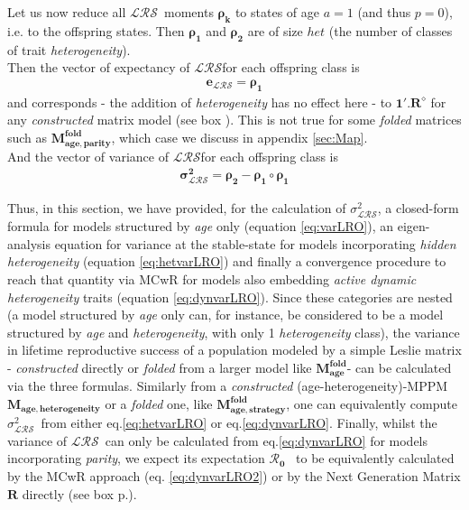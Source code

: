 \documentclass[10pt,a4paper]{article}
\newcommand{\Rzero}{$\boldsymbol{\mathcal{R}_{0}}$  }
\newcommand{\LRO}{$\mathcal{LRS}$}
\newcommand{\Ma}{$\mathbf{M^{fold}_{age}}$}
\newcommand{\Map}{$\mathbf{M^{fold}_{age,parity}}$}
\newcommand{\Mah}{$\mathbf{M^{fold}_{age,strategy}}$}
\newcommand{\vLRO}{$\sigma_{\mathrm{\mathcal{LRS}}}^2$}
\begin{document}
Let us now reduce all \LRO\ moments $\boldsymbol{\rho}_\mathbf{k}$ to states of age $a=1$ (and thus $p=0$), i.e. to the offspring states. Then $\boldsymbol{\rho}_\mathbf{1}$ and $\boldsymbol{\rho}_\mathbf{2}$ are of size $het$ (the number of classes of trait \emph{heterogeneity}). \\

Then the vector of expectancy of \LRO for each offspring class is
\begin{eqnarray}
\mathbf{e_{\mathcal{LRS}}}=\mathbf{\boldsymbol{\rho}_{1}}
\label{eq:dynvarLRO2}
\end{eqnarray}
 and corresponds - the addition of \emph{heterogeneity} has no effect here - to $\mathbf{1}'.\mathbf{R^{\diamond}}$ for any \emph{constructed} matrix model (see box \pageref{box:noteonR0}). This is not true for some \emph{folded} matrices such as \Map, which case we discuss in appendix \ref{sec:Map}.\\
 
And the vector of variance of \LRO for each offspring class is
\begin{eqnarray}
 \mathbf{\boldsymbol{\sigma}^{2}_{\mathcal{LRS}}}=\mathbf{\boldsymbol{\rho}_{2}}-\mathbf{\boldsymbol{\rho}_{1}}\circ\mathbf{\boldsymbol{\rho}_{1}}
\label{eq:dynvarLRO}
\end{eqnarray}

Thus, in this section, we have provided, for the calculation of \vLRO, a closed-form formula for models structured by \emph{age} only (equation \ref{eq:varLRO}), an eigen-analysis equation for variance at the stable-state for models incorporating \emph{hidden heterogeneity} (equation \ref{eq:hetvarLRO}) and finally a convergence procedure to reach that quantity via MCwR for models also embedding \emph{active dynamic heterogeneity} traits (equation \ref{eq:dynvarLRO}).
Since these categories are nested (a model structured by \emph{age} only can, for instance, be considered to be a model structured by \emph{age} and \emph{heterogeneity}, with only 1 \emph{heterogeneity} class), the variance in lifetime reproductive success of a population modeled by a simple Leslie matrix - \emph{constructed} directly or \emph{folded} from a larger model like \Ma - can be calculated via the three formulas. 
Similarly from a \emph{constructed} (age-heterogeneity)-MPPM $\mathbf{M_{age,heterogeneity}}$ or a \emph{folded} one, like \Mah, one can equivalently compute \vLRO\ from either eq.\ref{eq:hetvarLRO} or eq.\ref{eq:dynvarLRO}. 
Finally, whilst the variance of \LRO\ can only be calculated from eq.\ref{eq:dynvarLRO} for models incorporating \emph{parity}, we expect its expectation \Rzero\ to be equivalently calculated by the MCwR approach (eq. \ref{eq:dynvarLRO2}) or by the Next Generation Matrix $\mathbf{R}$ directly (see box p.\pageref{box:noteonR0}).
\end{document}
